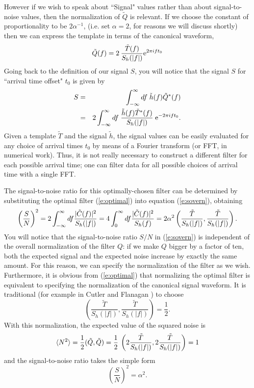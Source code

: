 However if we wish to speak about ``Signal" values rather than about
signal-to-noise values, then the normalization of $\tilde Q$ is relevant.
If we choose the constant of proportionality to be $2 \alpha^{-1}$,
(i.e. set $\alpha = 2$, for reasons we will discuss shortly) then we
can express the template in terms of the canonical waveform,
\begin{equation}
\label{e:optimal}
        \tilde{Q}(f)=2 \> \frac{\tilde{T}(f)}{S_h(|f|)} {\rm e}^{2\pi i f t_0}
\end{equation}
Going back to the definition of our signal $S$, you will notice that the
signal $S$ for ``arrival time offset" $t_0$ is given by
\begin{eqnarray}
\nonumber
S &=& \int_{-\infty}^\infty df \; \tilde h(f) \tilde Q^* (f) \\
\label{e:lag}
  &=& 2 \int_{-\infty}^\infty df \; { \tilde h(f) \tilde T^* (f) 
\over S_h(|f|)} \; {\rm e}^{- 2 \pi i f t_0}.
\end{eqnarray}
Given a template $\tilde T$ and the signal $\tilde h$, the signal
values can be easily evaluated for any choice of arrival times $t_0$ by
means of a Fourier transform (or FFT, in numerical work).  Thus, it is
not really necessary to construct a different filter for each possible
arrival time; one can filter data for all possible choices of arrival
time with a single FFT.

The signal-to-noise ratio for this optimally-chosen filter can be
determined by substituting the optimal filter (\ref{e:optimal}) into
equation (\ref{e:sovern}), obtaining
\begin{equation}
\nonumber
\left( {S \over N} \right)^2 = 
 2 \int_{-\infty}^\infty df {| \tilde C(f) |^2 \over S_h(|f|)} =
 4 \int_{0}^\infty df { | \tilde C(f) |^2 \over S_h(f)} = 2 \alpha^2 
 \left(\frac{\tilde{T}}{S_h(|f|)},\frac{\tilde{T}}{S_h(|f|)}\right).
\end{equation}
You will notice that the signal-to-noise ratio $S/N$ in
(\ref{e:sovern}) is independent of the overall normalization of the
filter $Q$:  if we make $Q$ bigger by a factor of ten, both the
expected signal and the expected noise increase by exactly the same
amount.  For this reason, we can specify the normalization of the 
filter as we wish. Furthermore, it is obvious from (\ref{e:optimal}) 
that normalizing the optimal filter is equivalent to specifying the
normalization of the canonical signal waveform. It is traditional
(for example in Cutler and Flanagan \cite{cutler:1994})
to choose 
\begin{equation}
\label{e:cfnorm}
   \left(\frac{\tilde{T}}{S_h(|f|)},\frac{\tilde{T}}{S_h(|f|)}
   \right)=\frac{1}{2}.
\end{equation}
With this normalization, 
the expected value of the squared noise is
\begin{equation}
\langle N^2 \rangle = {1 \over 2} (\tilde Q,\tilde Q) = {1 \over 2} \>
\left( 2 \frac{\tilde{T}}{S_h(|f|)},2 \frac{\tilde{T}}{S_h(|f|)}
   \right) = 1
\end{equation}
and the signal-to-noise ratio takes the simple form
\begin{equation}
\left(\frac{S}{N}\right)^2 = \alpha^2.
\end{equation}

\newpage

